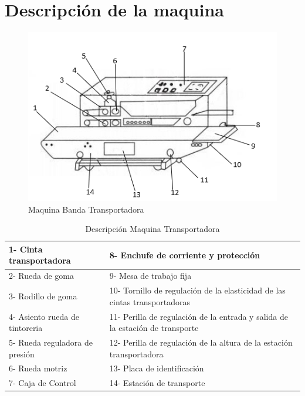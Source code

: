 	\section{Descripción de la maquina}
		\begin{figure}[ht]
		\centering
		\includegraphics[scale=0.95]{Figs/65.png}
		\caption{Maquina Banda Transportadora}
		\label{fig:Banda}
	\end{figure}

	\begin{table}[ht]
		\centering
		\begin{tabular}{|p{5cm}|p{8cm}|}
			\hline
			1- Cinta transportadora & 8- Enchufe de corriente y protección \\ 
			\hline
			2- Rueda de goma& 9- Mesa de trabajo fija\\
			\hline
			3- Rodillo de goma& 10- Tornillo de regulación de la elasticidad de las cintas transportadoras\\
			\hline
			4- Asiento rueda de tintoreria& 11- Perilla de regulación de la entrada y salida de la estación de transporte\\
			\hline
			5- Rueda reguladora de presión& 12- Perilla de regulación de la altura de la estación transportadora\\
			\hline
			6- Rueda motriz& 13- Placa de identificación\\
			\hline
			7- Caja de Control& 14- Estación de transporte\\
			\hline
		\end{tabular}	
		\caption{Descripción Maquina Transportadora}
		\label{table:Banda}
	\end{table}

\newpage
